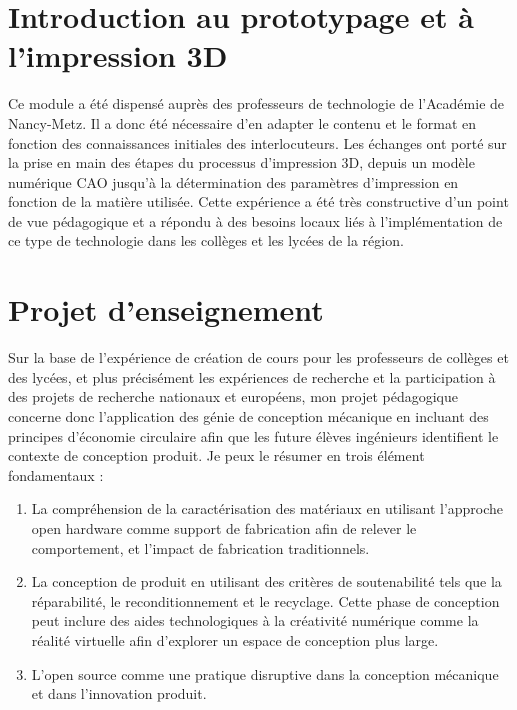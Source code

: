 \documentclass[
  12pt,
  oneside]{book}
\providecommand{\tightlist}{%
  \setlength{\itemsep}{0pt}\setlength{\parskip}{0pt}}
\begin{document}
\hypertarget{introduction-au-prototypage-et-uxe0-limpression-3d}{%
\section{Introduction au prototypage et à l'impression 3D}\label{introduction-au-prototypage-et-uxe0-limpression-3d}}

Ce module a été dispensé auprès des professeurs de technologie de l'Académie de Nancy-Metz. Il a donc été nécessaire d'en adapter le contenu et le format en fonction des connaissances initiales des interlocuteurs. Les échanges ont porté sur la prise en main des étapes du processus d'impression 3D, depuis un modèle numérique CAO jusqu'à la détermination des paramètres d'impression en fonction de la matière utilisée.
Cette expérience a été très constructive d'un point de vue pédagogique et a répondu à des besoins locaux liés à l'implémentation de ce type de technologie dans les collèges et les lycées de la région.

\hypertarget{projet-denseignement}{%
\section{Projet d'enseignement}\label{projet-denseignement}}

Sur la base de l'expérience de création de cours pour les professeurs de collèges et des lycées, et plus précisément les expériences de recherche et la participation à des projets de recherche nationaux et européens, mon projet pédagogique concerne donc l'application des génie de conception mécanique en incluant des principes d'économie circulaire afin que les future élèves ingénieurs identifient le contexte de conception produit. Je peux le résumer en trois élément fondamentaux :

\begin{enumerate}
\def\labelenumi{\arabic{enumi}.}
\tightlist
\item
  La compréhension de la caractérisation des matériaux en utilisant l'approche open hardware comme support de fabrication afin de relever le comportement, et l'impact de fabrication traditionnels.
\item
  La conception de produit en utilisant des critères de soutenabilité tels que la réparabilité, le reconditionnement et le recyclage. Cette phase de conception peut inclure des aides technologiques à la créativité numérique comme la réalité virtuelle afin d'explorer un espace de conception plus large.
\item
  L'open source comme une pratique disruptive dans la conception mécanique et dans l'innovation produit.
\end{enumerate}
\end{document}
